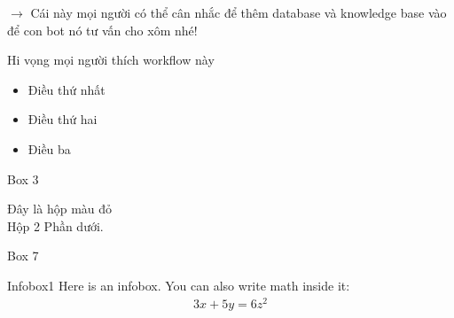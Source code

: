 $\rightarrow$ Cái này mọi người có thể cân nhắc để thêm database và knowledge base vào để con bot nó tư vấn cho xôm nhé!

\newpage 

\begin{mynote} 
Hi vọng mọi người thích workflow này    
 \begin{itemize}[label=\small\rhombusdot]
 \item Điều thứ nhất
 \item Điều thứ hai
 \item Điều ba
 \end{itemize}
\end{mynote} 

\begin{tcolorbox}[title=Hộp xanh lá cây]
Box 3
\end{tcolorbox}


\begin{tcolorbox}[colback=red!5!white,colframe=red!75!black,title=My nice heading]
Đây là hộp màu đỏ\\ Hộp  2
\tcblower
Phần dưới.
\end{tcolorbox}

\begin{tcolorbox}[enhanced,
  opacityback=0.75,opacitybacktitle=0.25,
  colback=blue!5!white,colframe=blue!75!black,
  title=My title]
  Box 7
\end{tcolorbox}
    
\begin{infobox}[label=box:info]{Infobox1}
Here is an infobox. You can also write math inside it:
\begin{align*}
    3x+5y=6z^2
\end{align*}
\end{infobox}